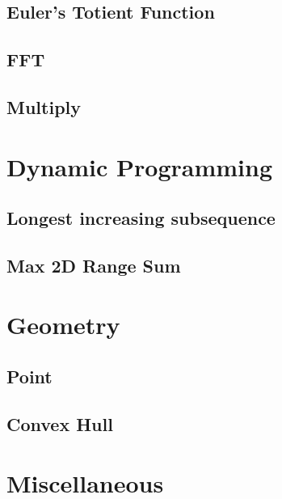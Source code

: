 \subsection{Euler’s Totient Function}
\raggedbottom
\hrulefill
\subsection{FFT}
\raggedbottom
\hrulefill
\subsection{Multiply}
\raggedbottom
\hrulefill

\section{Dynamic Programming}
\subsection{Longest increasing subsequence}
\raggedbottom
\hrulefill
\subsection{Max 2D Range Sum}
\raggedbottom
\hrulefill

\section{Geometry}
\subsection{Point}
\raggedbottom
\hrulefill
\subsection{Convex Hull}
\raggedbottom
\hrulefill

\section{Miscellaneous}

